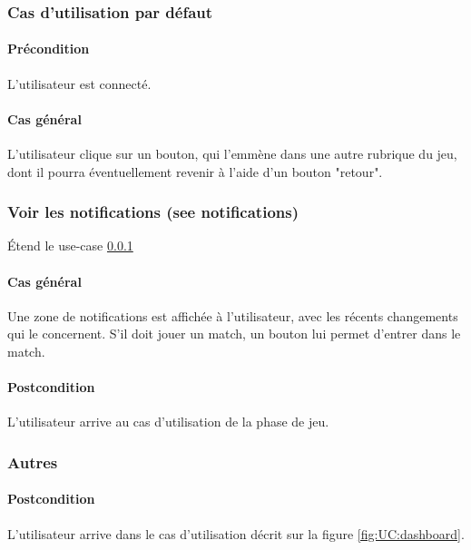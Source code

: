 \subsubsection{Cas d'utilisation par défaut}
    \label{UC:dashboard}
    \paragraph{Précondition} L'\gls{utilisateur} est connecté.
    \paragraph{Cas général} L'utilisateur clique sur un bouton, qui l'emmène dans une autre rubrique du jeu, dont il pourra éventuellement revenir à l'aide d'un bouton "retour".

\subsubsection{Voir les notifications (see notifications)}
    \'Etend le use-case \ref{UC:dashboard}
    \paragraph{Cas général} Une zone de notifications est affichée à l'utilisateur, avec les récents changements qui le concernent. S'il doit jouer un match, un bouton lui permet d'entrer dans le match.
    \paragraph{Postcondition} L'utilisateur arrive au cas d'utilisation de la phase de jeu.

\subsubsection{Autres}
    \paragraph{Postcondition} L'utilisateur arrive dans le cas d'utilisation décrit sur la figure \ref{fig:UC:dashboard}.

